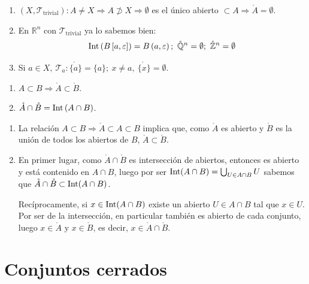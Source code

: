 \begin{ej}
\begin{enumerate}
    \item $\left( X, \mathcal{T}_{\text{trivial}} \right): A \neq X \Rightarrow A \not \supset X \Rightarrow \emptyset$ es el único abierto $\subset A \Rightarrow \mathring{A} = \emptyset$.

    \item En $\mathbb{R}^n$ con $\mathcal{T}_{\text{trivial}}$ ya lo sabemos bien:
    \[
    \inter\left( B\left[ a, \varepsilon \right] \right)  = B\left( a, \varepsilon \right);\ \mathring{\mathbb{Q}}^n = \emptyset;\ \mathring{\mathbb{Z}}^n = \emptyset
    \]
    \item Si $a \in X,\ \mathcal{T}_a : \mathring{\{a\}} = \{a\};\ x \neq a,\ \mathring{\{x\}} = \emptyset$.
\end{enumerate}
\end{ej}

\begin{coro}
\begin{enumerate}
    \item $A \subset B \Rightarrow \mathring{A} \subset \mathring{B}$.
    \item $\mathring{A} \cap \mathring{B} = \operatorname{Int} \left( A \cap B \right)$.
\end{enumerate}
\end{coro}
\begin{demo}
\begin{enumerate}
    \item La relación $A \subset B \Rightarrow \mathring{A} \subset A \subset B$ implica que, como $\mathring{A}$ es abierto y $\mathring{B}$ es la unión de todos los abiertos de $B$, $\mathring{A} \subset \mathring{B}$.
    \item En primer lugar, como $\mathring{A}\cap \mathring{B}$ es intersección de abiertos, entonces es abierto y está contenido en $A\cap B$, luego por ser $\operatorname{Int}(A\cap B) = \bigcup_{U\in A\cap B}U$ sabemos que $\mathring{A}\cap \mathring{B} \subset \operatorname{Int}(A\cap B)$.
    
	Recíprocamente, si $x\in \operatorname{Int}(A\cap B)$ existe un abierto $U \in A\cap B$ tal que $x\in U$. Por ser de la intersección, en particular también es abierto de cada conjunto, luego $x\in \mathring{A}$ y $x\in \mathring{B}$, es decir, $x\in \mathring{A}\cap \mathring{B}$.
\end{enumerate}
\end{demo}

\section{Conjuntos cerrados}%
\label{sec:conjuntos_cerrados}

